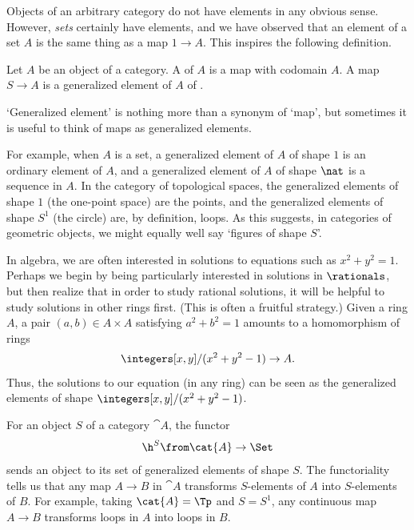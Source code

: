 Objects of an arbitrary category do not have elements in any obvious sense.
However, \emph{sets} certainly have elements, and we have observed that an
element of a set $A$ is the same thing as a map $1 \to A$.  This inspires
the following definition.

\begin{defn}  
\label{defn:gen-elt}
Let $A$ be an object of a category.  A  of $A$ is a map with codomain $A$.  A map $S \to A$ is a
generalized element of $A$ of .
\end{defn}

`Generalized element' is nothing more than a synonym of `map', but
sometimes it is useful to think of maps as generalized elements.

For example, when $A$ is a set, a generalized element of $A$ of shape $1$
is an ordinary element of $A$, and a generalized element of $A$ of shape
$\nat$ is a sequence%
%
%
in $A$.  In the category of topological spaces, the generalized elements of
shape $1$ (the one-point space) are the points, and the generalized
elements of shape $S^1$ (the circle) are, by definition, loops.%
%
%
As this suggests, in categories of geometric objects, we might equally well
say `figures of shape $S$'.

In algebra,%
%
%
we are often interested in solutions to equations such as $x^2 + y^2 = 1$.
Perhaps we begin by being particularly interested in solutions in
$\rationals$, but then realize that in order to study rational solutions,
it will be helpful to study solutions in other rings first.  (This is often
a fruitful strategy.)  Given a ring $A$, a pair $(a, b) \in A \times A$
satisfying $a^2 + b^2 = 1$ amounts to a homomorphism of rings
\[
\integers[x, y]/(x^2 + y^2 - 1) \to A.
%
\index{algebraic geometry}
%
\]
Thus, the solutions to our equation (in any ring) can be seen as the
generalized elements of shape $ \integers[x, y]/(x^2 + y^2 - 1)$.

For an object $S$ of a category $\cat{A}$, the functor
\[
\h^S\from \cat{A} \to \Set
\]
sends an object to its set of generalized elements of shape $S$.  The
functoriality tells us that any map $A \to B$ in $\cat{A}$ transforms
$S$-elements of $A$ into $S$-elements of $B$.  For example, taking $\cat{A}
= \Tp$ and $S = S^1$, any continuous map $A \to B$ transforms loops in $A$
into loops in $B$.%
%
%


